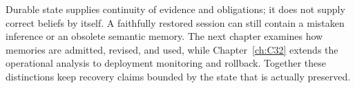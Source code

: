 Durable state supplies continuity of evidence and obligations; it does not supply correct beliefs by itself. A faithfully restored session can still contain a mistaken inference or an obsolete semantic memory. The next chapter examines how memories are admitted, revised, and used, while Chapter~\ref{ch:C32} extends the operational analysis to deployment monitoring and rollback. Together these distinctions keep recovery claims bounded by the state that is actually preserved.
